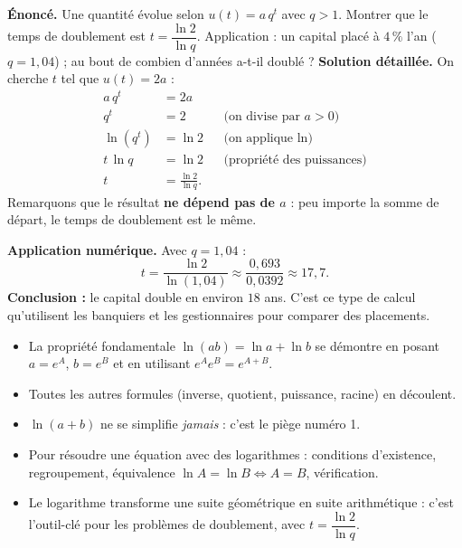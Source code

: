 \documentclass[11pt]{article}
\begin{document}
\begin{exoresolu}
\textbf{Énoncé.} Une quantité évolue selon $u(t)=a\,q^{t}$ avec $q>1$. Montrer que le temps de doublement est $t=\dfrac{\ln 2}{\ln q}$. Application : un capital placé à $4\,\%$ l'an ($q=1{,}04$) ; au bout de combien d'années a-t-il doublé ?
\tcblower
\textbf{Solution détaillée.} On cherche $t$ tel que $u(t)=2a$ :
\begin{align*}
a\,q^{t} &= 2a \\
q^{t} &= 2 && \text{(on divise par } a>0\text{)} \\
\ln(q^{t}) &= \ln 2 && \text{(on applique } \ln\text{)} \\
t\,\ln q &= \ln 2 && \text{(propriété des puissances)} \\
t &= \frac{\ln 2}{\ln q}.
\end{align*}
Remarquons que le résultat \textbf{ne dépend pas de $a$} : peu importe la somme de départ, le temps de doublement est le même.

\textbf{Application numérique.} Avec $q=1{,}04$ :
\[ t=\frac{\ln 2}{\ln(1{,}04)}\approx\frac{0{,}693}{0{,}0392}\approx 17{,}7. \]
\textbf{Conclusion :} le capital double en environ $18$ ans. C'est ce type de calcul qu'utilisent les banquiers et les gestionnaires pour comparer des placements.
\end{exoresolu}

\begin{aretenir}
\begin{itemize}
\item La propriété fondamentale $\ln(ab)=\ln a+\ln b$ se démontre en posant $a=e^{A}$, $b=e^{B}$ et en utilisant $e^{A}e^{B}=e^{A+B}$.
\item Toutes les autres formules (inverse, quotient, puissance, racine) en découlent.
\item $\ln(a+b)$ ne se simplifie \emph{jamais} : c'est le piège numéro 1.
\item Pour résoudre une équation avec des logarithmes : conditions d'existence, regroupement, équivalence $\ln A=\ln B\iff A=B$, vérification.
\item Le logarithme transforme une suite géométrique en suite arithmétique : c'est l'outil-clé pour les problèmes de doublement, avec $t=\dfrac{\ln 2}{\ln q}$.
\end{itemize}
\end{aretenir}
\end{document}
